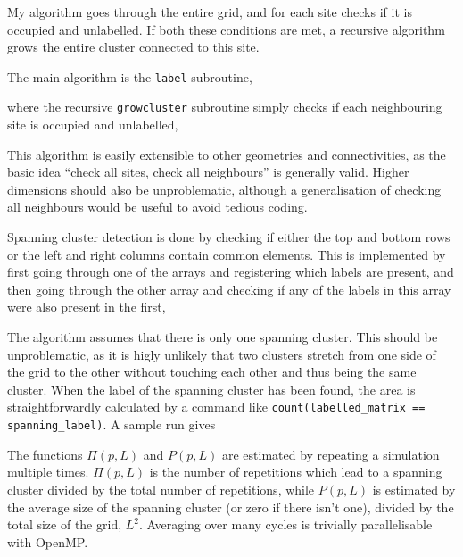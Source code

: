 \documentclass[11pt,british,a4paper]{report}
\begin{document}
My algorithm goes through the entire grid, and for each site checks if it is occupied and unlabelled. If both these conditions are met, a recursive algorithm grows the entire cluster connected to this site.

The main algorithm is the \lstinline{label} subroutine,

where the recursive \lstinline{growcluster} subroutine simply checks if each neighbouring site is occupied and unlabelled,

This algorithm is easily extensible to other geometries and connectivities, as the basic idea ``check all sites, check all neighbours'' is generally valid. Higher dimensions should also be unproblematic, although a generalisation of checking all neighbours would be useful to avoid tedious coding.

Spanning cluster detection is done by checking if either the top and bottom rows or the left and right columns contain common elements. This is implemented by first going through one of the arrays and registering which labels are present, and then going through the other array and checking if any of the labels in this array were also present in the first,

The algorithm assumes that there is only one spanning cluster. This should be unproblematic, as it is higly unlikely that two clusters stretch from one side of the grid to the other without touching each other and thus being the same cluster. When the label of the spanning cluster has been found, the area is straightforwardly calculated by a command like \lstinline{count(labelled_matrix == spanning_label)}.
A sample run gives


The functions \(\Pi(p,L)\) and \(P(p,L)\) are estimated by repeating a simulation multiple times. \(\Pi(p,L)\) is the number of repetitions which lead to a spanning cluster divided by the total number of repetitions, while \(P(p,L)\) is estimated by the average size of the spanning cluster (or zero if there isn't one), divided by the total size of the grid, \(L^2\). Averaging over many cycles is trivially parallelisable with OpenMP.

%
\end{document}
